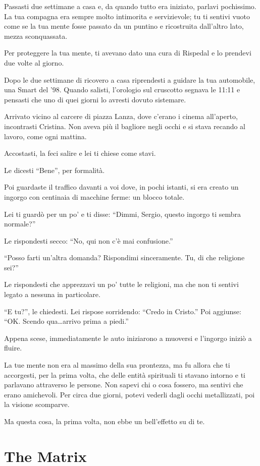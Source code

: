Passasti due settimane a casa e, da quando tutto era iniziato, parlavi pochissimo. La tua compagna era sempre molto intimorita e servizievole; tu ti sentivi vuoto come se la tua mente fosse passato da un puntino e ricostruita dall'altro lato, mezza sconquassata.

Per proteggere la tua mente, ti avevano dato una cura di Rispedal e lo prendevi due volte al giorno.

Dopo le due settimane di ricovero a casa riprendesti a guidare la tua automobile, una Smart del '98. Quando salisti, l'orologio sul cruscotto segnava le 11:11 e pensasti che uno di quei giorni lo avresti dovuto sistemare.

Arrivato vicino al carcere di piazza Lanza, dove c'erano i cinema all'aperto, incontrasti Cristina. Non aveva più il bagliore negli occhi e si stava recando al lavoro, come ogni mattina.

Accostasti, la feci salire e lei ti chiese come stavi.

Le dicesti “Bene”, per formalità.

Poi guardaste il traffico davanti a voi dove, in pochi istanti, si era creato un ingorgo con centinaia di macchine ferme: un blocco totale.

Lei ti guardò per un po' e ti disse: “Dimmi, Sergio, questo ingorgo ti sembra normale?”

Le rispondesti secco: “No, qui non c'è mai confusione.”

“Posso farti un'altra domanda? Rispondimi sin\-ce\-ra\-mente. Tu, di che religione sei?”

Le rispondesti che apprezzavi un po' tutte le religioni, ma che non ti sentivi legato a nessuna in particolare.

“E tu?”, le chiedesti. Lei rispose sorridendo: “Credo in Cristo.” Poi aggiunse: “OK. Scendo qua\ldots arrivo prima a piedi.”

Appena scese, immediatamente le auto iniziarono a muoversi e l'ingorgo iniziò a fluire.

La tue mente non era al massimo della sua prontezza, ma fu allora che ti accorgesti, per la prima volta, che delle entità spirituali ti stavano intorno e ti parlavano attraverso le persone. Non sapevi chi o cosa fossero, ma sentivi che erano amichevoli. Per circa due giorni, potevi vederli dagli occhi metallizzati, poi la visione scomparve.

Ma questa cosa, la prima volta, non ebbe un bell'effetto su di te.

\section{The Matrix}
\label{the_matrix}

